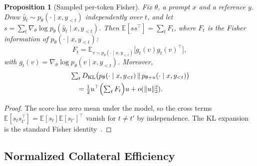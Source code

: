 \documentclass[11pt]{article}
\newtheorem{proposition}{Proposition}
\begin{document}
\begin{proposition}[Sampled per-token Fisher]
\label{prop:mcfisher}
Fix $\theta$, a prompt $x$ and a reference $y$. Draw $\hat y_t\sim p_\theta(\cdot\mid x,y_{<t})$ independently over $t$, and let $s=\sum_t\nabla_\theta\log p_\theta(\hat y_t\mid x,y_{<t})$. Then $\mathbb E[ss^\top]=\sum_tF_t$, where $F_t$ is the Fisher information of $p_\theta(\cdot\mid x,y_{<t})$:
\begin{equation*}
F_t=\mathbb E_{v\sim p_\theta(\cdot\mid x,y_{<t})}\bigl[g_t(v)g_t(v)^\top\bigr],
\end{equation*}
with $g_t(v)=\nabla_\theta\log p_\theta(v\mid x,y_{<t})$. Moreover,
\begin{equation*}
\begin{aligned}
&\textstyle\sum_t D_{\mathrm{KL}}\bigl(p_\theta(\cdot\mid x,y_{<t})\,\Vert\,p_{\theta+u}(\cdot\mid x,y_{<t})\bigr)\\
&\quad=\tfrac12u^\top\Bigl(\textstyle\sum_tF_t\Bigr)u+o(\|u\|_2^2).
\end{aligned}
\end{equation*}
\end{proposition}
\begin{proof}
The score has zero mean under the model, so the cross terms $\mathbb E[s_ts_{t'}^\top]=\mathbb E[s_t]\mathbb E[s_{t'}]^\top$ vanish for $t\ne t'$ by independence. The KL expansion is the standard Fisher identity~\citep{amari1998natural,martens2020new}.
\end{proof}

\subsection{Normalized Collateral Efficiency}
\label{app:eta}
\end{document}
